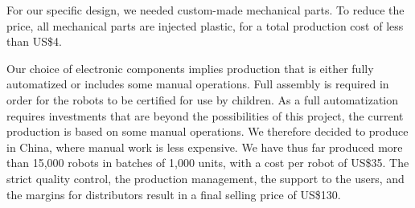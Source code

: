 \documentclass[letterpaper, 10 pt, conference]{ieeeconf}  %
\begin{document}
For our specific design, we needed custom-made mechanical parts.
To reduce the price, all mechanical parts are injected plastic, for a total production cost of less than US\$4.

Our choice of electronic components implies production that is either fully automatized or includes some manual operations. 
Full assembly is required in order for the robots to be certified for use by children. 
As a full automatization requires investments that are beyond the possibilities of this project, the current production is based on some manual operations. 
We therefore decided to produce in China, where manual work is less expensive.
We have thus far produced more than 15,000 robots in batches of 1,000 units, with a cost per robot of US\$35.
The strict quality control, the production management, the support to the users, and the margins for distributors result in a final selling price of US\$130.

\end{document}
